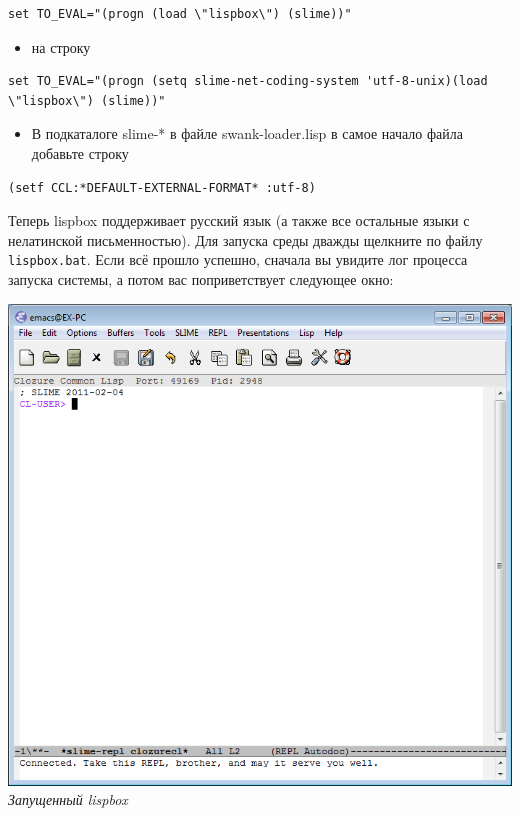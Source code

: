 \documentclass[a4paper, 12pt, titlepage, twoside]{article}
\begin{document}
\footnotesize
\begin{verbatim}
set TO_EVAL="(progn (load \"lispbox\") (slime))"
\end{verbatim}
\normalsize

\begin{itemize}
\item[] на строку
\end{itemize}

\footnotesize
\begin{verbatim} 
set TO_EVAL="(progn (setq slime-net-coding-system 'utf-8-unix)(load \"lispbox\") (slime))"
\end{verbatim}
\normalsize

\begin{itemize}
\item В подкаталоге slime-* в файле swank-loader.lisp в самое начало файла добавьте строку
\end{itemize}
\footnotesize
\begin{verbatim} 
(setf CCL:*DEFAULT-EXTERNAL-FORMAT* :utf-8)
\end{verbatim}
\normalsize

Теперь lispbox поддерживает русский язык (а также все остальные языки с нелатинской письменностью).
Для запуска среды дважды щелкните по файлу \verb|lispbox.bat|. Если всё прошло успешно, сначала вы увидите лог процесса запуска системы, а потом вас поприветствует следующее окно:
\begin{center}
  \includegraphics[scale=.6]{lispbox_started}\\
  \small{\textit{Запущенный lispbox}}
\end{center}
\end{document}
